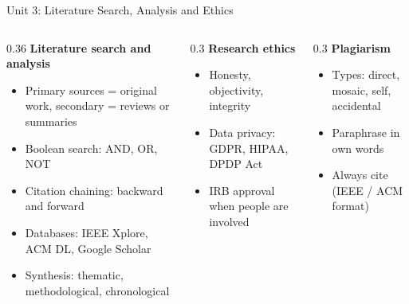 \documentclass[aspectratio=169,10pt]{beamer}
\begin{document}
\begin{frame}{Unit 3: Literature Search, Analysis and Ethics}
\begin{columns}[T]
\begin{column}{0.36\textwidth}
\textbf{Literature search and analysis}
\begin{itemize}
\item Primary sources = original work, secondary = reviews or summaries
\item Boolean search: AND, OR, NOT
\item Citation chaining: backward and forward
\item Databases: IEEE Xplore, ACM DL, Google Scholar
\item Synthesis: thematic, methodological, chronological
\end{itemize}
\end{column}
\begin{column}{0.3\textwidth}
\textbf{Research ethics}
\begin{itemize}
\item Honesty, objectivity, integrity
\item Data privacy: GDPR, HIPAA, DPDP Act
\item IRB approval when people are involved
\end{itemize}
\end{column}
\begin{column}{0.3\textwidth}
\textbf{Plagiarism}
\begin{itemize}
\item Types: direct, mosaic, self, accidental
\item Paraphrase in own words
\item Always cite (IEEE / ACM format)
\end{itemize}
\end{column}
\end{columns}
\end{frame}
\end{document}
